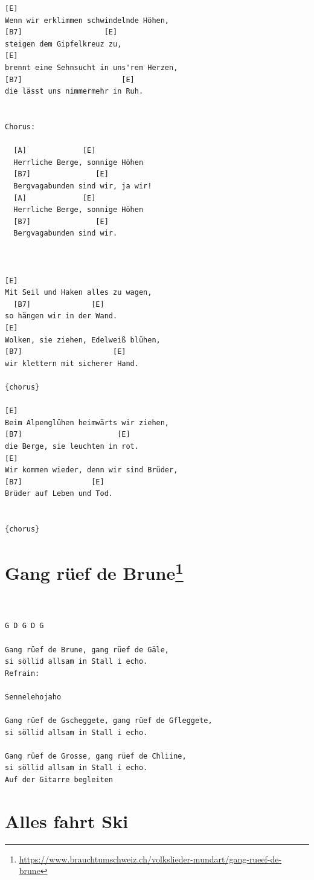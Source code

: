 \documentclass[
]{book}
\let\stdsection\section
\renewcommand\section{\clearpage\stdsection}
\begin{document}
\begin{verbatim}
[E]
Wenn wir erklimmen schwindelnde Höhen,
[B7]                   [E]
steigen dem Gipfelkreuz zu,
[E]
brennt eine Sehnsucht in uns'rem Herzen,
[B7]                       [E]
die lässt uns nimmermehr in Ruh.


Chorus:
  
  [A]             [E]
  Herrliche Berge, sonnige Höhen
  [B7]               [E]
  Bergvagabunden sind wir, ja wir!
  [A]             [E]
  Herrliche Berge, sonnige Höhen
  [B7]               [E]
  Bergvagabunden sind wir.
  


[E]      
Mit Seil und Haken alles zu wagen,
  [B7]              [E]
so hängen wir in der Wand.
[E]     
Wolken, sie ziehen, Edelweiß blühen,
[B7]                     [E]
wir klettern mit sicherer Hand.

{chorus}

[E]
Beim Alpenglühen heimwärts wir ziehen,
[B7]                      [E]
die Berge, sie leuchten in rot.
[E]                   
Wir kommen wieder, denn wir sind Brüder,
[B7]                [E]
Brüder auf Leben und Tod.


{chorus}
\end{verbatim}

\hypertarget{volkslieder-gang-ruef-de-bruune}{%
\section[Gang rüef de Brune]{\texorpdfstring{Gang rüef de Brune\footnote{\url{https://www.brauchtumschweiz.ch/volkslieder-mundart/gang-rueef-de-brune}}}{Gang rüef de Brune}}\label{volkslieder-gang-ruef-de-bruune}}

\begin{verbatim}


G D G D G

Gang rüef de Brune, gang rüef de Gäle,
si söllid allsam in Stall i echo.
Refrain:

Sennelehojaho

Gang rüef de Gscheggete, gang rüef de Gfleggete,
si söllid allsam in Stall i echo.

Gang rüef de Grosse, gang rüef de Chliine,
si söllid allsam in Stall i echo.
Auf der Gitarre begleiten
\end{verbatim}

\hypertarget{volkslieder-alles-fahrt-ski}{%
\section{Alles fahrt Ski}\label{volkslieder-alles-fahrt-ski}}
\end{document}
